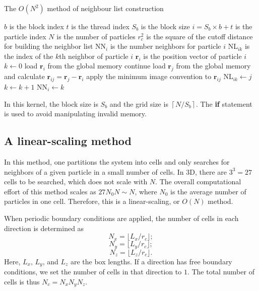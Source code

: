\documentclass[12pt,a4paper]{report}
\newcommand{\vect}[1]{\boldsymbol{#1}}
\begin{document}
\begin{algorithm}[htb]
\caption{The $O(N^2)$ method of neighbour list construction }
\label{algorithm:neighbour_ON2}
\begin{algorithmic}[1]
\Require $b$ is the block index
\Require $t$ is the thread index
\Require $S_b$ is the block size
\Require $i=S_b\times b+t$ is the particle index
\Require $N$ is the number of particles
\Require $r_c^2$ is the square of the cutoff distance for building the neighbor list
\Require NN$_{i}$ is the number neighbors for particle $i$
\Require NL$_{ik}$ is the index of the $k$th neighbor of particle $i$
\Require $\vect{r}_{i}$ is the position vector of particle $i$
\State $k\leftarrow 0$
    \State load $\vect{r}_{i}$ from the global memory
            \State continue
        \EndIf
        \State load $\vect{r}_{j}$ from the global memory and calculate
               $\vect{r}_{ij} = \vect{r}_{j} - \vect{r}_{i}$
        \State apply the minimum image convention to $\vect{r}_{ij}$
        \If {$|\vect{r}_{ij}|^2 < r_c^2$}
            \State NL$_{ik}\leftarrow j$
            \State $k\leftarrow k+1$
        \EndIf
    \EndFor
    \State NN$_{i}\leftarrow k$
\EndIf
 \end{algorithmic}
\end{algorithm}

In this kernel, the block size is $S_b$ and the grid size is $\left \lceil {N/S_b} \right \rceil$. The \textbf{if} statement is used to avoid manipulating invalid memory.


\subsection{A linear-scaling method}


In this method, one partitions the system into cells and only searches for neighbors of a given particle in a small number of cells. In 3D, there are $3^3=27$ cells to be searched, which does not scale with $N$. The overall computational effort of this method scales as $27N_0N \sim N$, where $N_0$ is the average number of particles in one cell. Therefore, this is a linear-scaling, or $O(N)$ method.

When periodic boundary conditions are applied, the number of cells in each direction is determined as
\begin{equation}
N_{x} = \lfloor L_x / r_c \rfloor;
\end{equation}
\begin{equation}
N_{y} = \lfloor L_y / r_c \rfloor;
\end{equation}
\begin{equation}
N_{z} = \lfloor L_z / r_c \rfloor.
\end{equation}
Here, $L_x$, $L_y$, and $L_z$ are the box lengths.
If a direction has free boundary conditions, we set the number of cells in that direction to $1$. The total number of cells is thus $N_c = N_x N_y N_z$.
\end{document}
